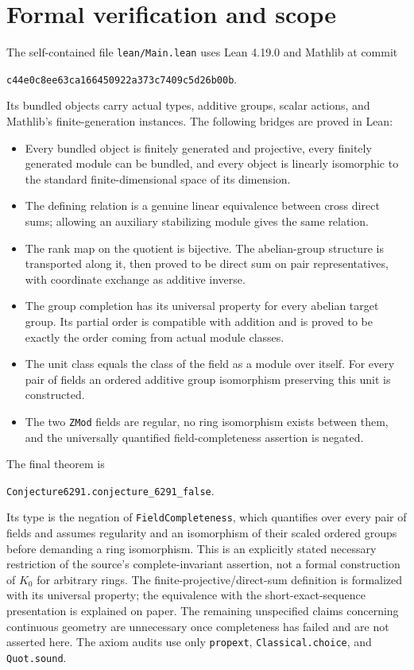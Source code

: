 \documentclass[11pt]{article}
\begin{document}
\section*{Formal verification and scope}
The self-contained file \texttt{lean/Main.lean} uses Lean 4.19.0 and
Mathlib at commit
\begin{center}\texttt{c44e0c8ee63ca166450922a373c7409c5d26b00b}.\end{center}
Its bundled objects carry actual types, additive groups, scalar actions,
and Mathlib's finite-generation instances. The following bridges are
proved in Lean:
\begin{itemize}
\item Every bundled object is finitely generated and projective, every
finitely generated module can be bundled, and every object is linearly
isomorphic to the standard finite-dimensional space of its dimension.
\item The defining relation is a genuine linear equivalence between
cross direct sums; allowing an auxiliary stabilizing module gives the
same relation.
\item The rank map on the quotient is bijective. The abelian-group
structure is transported along it, then proved to be direct sum on pair
representatives, with coordinate exchange as additive inverse.
\item The group completion has its universal property for every abelian
target group. Its partial order is compatible with addition and is
proved to be exactly the order coming from actual module classes.
\item The unit class equals the class of the field as a module over
itself. For every pair of fields an ordered additive group isomorphism
preserving this unit is constructed.
\item The two \texttt{ZMod} fields are regular, no ring isomorphism exists
between them, and the universally quantified field-completeness
assertion is negated.
\end{itemize}
The final theorem is
\begin{center}\texttt{Conjecture6291.conjecture\_6291\_false}.\end{center}
Its type is the negation of \texttt{FieldCompleteness}, which quantifies
over every pair of fields and assumes regularity and an isomorphism of
their scaled ordered groups before demanding a ring isomorphism.
This is an explicitly stated necessary restriction of the source's
complete-invariant assertion, not a formal construction of $K_0$ for
arbitrary rings. The finite-projective/direct-sum definition is
formalized with its universal property; the equivalence with the
short-exact-sequence presentation is explained on paper. The remaining
unspecified claims concerning continuous geometry are unnecessary once
completeness has failed and are not asserted here. The axiom audits use
only \texttt{propext}, \texttt{Classical.choice}, and \texttt{Quot.sound}.
\end{document}
